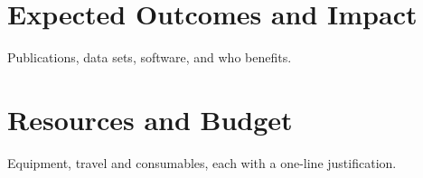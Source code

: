 \documentclass[11pt,a4paper]{article}
\begin{document}
\section{Expected Outcomes and Impact}
Publications, data sets, software, and who benefits.

\section{Resources and Budget}
Equipment, travel and consumables, each with a one-line justification.



\end{document}
